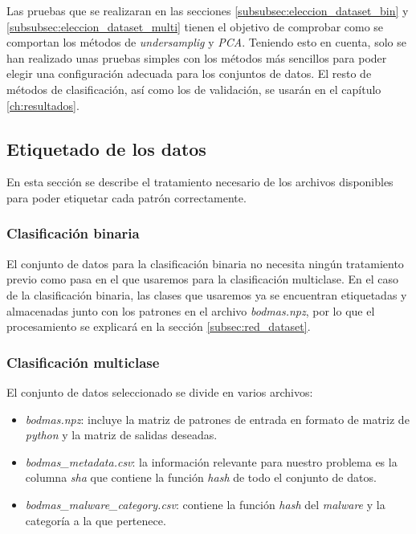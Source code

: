 \vspace{1em}

Las pruebas que se realizaran en las secciones \ref{subsubsec:eleccion_dataset_bin} y \ref{subsubsec:eleccion_dataset_multi} tienen el objetivo de comprobar como se comportan los métodos de \textit{undersamplig} y \textit{PCA}. Teniendo esto en cuenta, solo se han realizado unas pruebas simples con los métodos más sencillos para poder elegir una configuración adecuada para los conjuntos de datos. El resto de métodos de clasificación, así como los de validación, se usarán en el capítulo \ref{ch:resultados}.

\subsection{Etiquetado de los datos}
\label{subsec:etiquetado}

En esta sección se describe el tratamiento necesario de los archivos disponibles para poder etiquetar cada patrón correctamente.

\subsubsection{Clasificación binaria}
\label{subsubsec:bin}

El conjunto de datos para la clasificación binaria no necesita ningún tratamiento previo como pasa en el que usaremos para la clasificación multiclase. En el caso de la clasificación binaria, las clases que usaremos ya se encuentran etiquetadas y almacenadas junto con los patrones en el archivo \textit{bodmas.npz}, por lo que el procesamiento se explicará en la sección \ref{subsec:red_dataset}.

\newpage
\subsubsection{Clasificación multiclase}
\label{subsubsec:multiclass}

El conjunto de datos seleccionado se divide en varios archivos:

\begin{itemize}
	\item \textit{bodmas.npz}: incluye la matriz de patrones de entrada en formato de matriz de \textit{python} y la matriz de salidas deseadas.
	\item \textit{bodmas\_metadata.csv}: la información relevante para nuestro problema es la columna \textit{sha} que contiene la función \textit{hash} de todo el conjunto de datos.
	\item \textit{bodmas\_malware\_category.csv}: contiene la función \textit{hash} del \textit{malware} y la categoría a la que pertenece.
\end{itemize}

